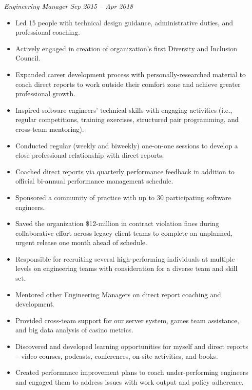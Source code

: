 {\sl Engineering Manager} \hfill {\sl Sep 2015 -- Apr 2018} 
\begin{itemize} 
\item Led 15 people with technical design guidance, administrative duties, and professional coaching.
\item Actively engaged in creation of organization’s first Diversity and Inclusion Council.
\item Expanded career development process with personally-researched material to coach direct reports to work outside their comfort zone and achieve greater professional growth.
\item Inspired software engineers' technical skills with engaging activities (i.e., regular competitions, training exercises, structured pair programming, and cross-team mentoring).
\item Conducted regular (weekly and biweekly) one-on-one sessions to develop a close professional relationship with direct reports.
\item Coached direct reports via quarterly performance feedback in addition to official bi-annual performance management schedule.
\item Sponsored a community of practice with up to 30 participating software engineers.
\item Saved the organization \$12-million in contract violation fines during collaborative effort across legacy client teams to complete an unplanned, urgent release one month ahead of schedule.
\item Responsible for recruiting several high-performing individuals at multiple levels on engineering teams with consideration for a diverse team and skill set.
\item Mentored other Engineering Managers on direct report coaching and development.
\item Provided cross-team support for our server system, games team assistance, and big data analysis of casino metrics.
\item Discovered and developed learning opportunities for myself and direct reports -- video courses, podcasts, conferences, on-site activities, and books.
\item Created performance improvement plans to coach under-performing engineers and engaged them to address issues with work output and policy adherence.
\end{itemize}

\vspace{12pt} %


